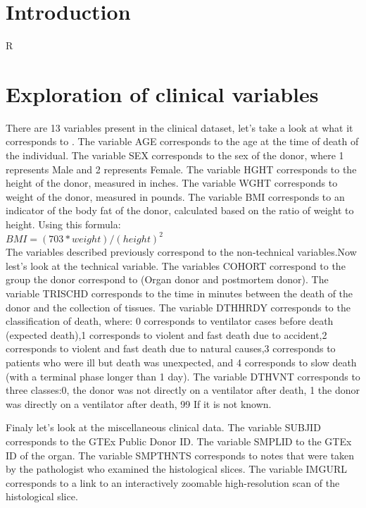 \documentclass[a4paper, 11pt]{article}
\begin{document}
\begin{multicols}{2}

\section{Introduction}
R \citep{R:2024}

\section{Exploration of  clinical variables}

There are 13 variables present in the clinical dataset, let's take a look at what it corresponds to . 
The variable AGE corresponds to the age at the time of death of the individual.
The variable SEX corresponds to the sex of the donor, where 1 represents Male and 2 represents Female.
The variable HGHT corresponds to the height of the donor, measured in inches.
The variable WGHT corresponds to weight of the donor, measured in pounds. 
The variable BMI corresponds to an indicator of the body fat of the donor, calculated based on the ratio of weight to height. Using this formula: 
\\

$ BMI = (703*weight)/(height)^2$ 
\\

The variables described previously correspond to the non-technical variables.Now lest's look at the technical variable. 
The variables COHORT correspond to the group the donor correspond to (Organ donor and postmortem donor). 
The variable TRISCHD corresponds to the time in minutes between the death of the donor and the collection of tissues.
The variable DTHHRDY corresponds to the classification of death, where: 0 corresponds to ventilator cases before death (expected death),1 corresponds to violent and fast death due to accident,2 corresponds to violent and fast death due to natural causes,3 corresponds to patients who were ill but death was unexpected, and 4 corresponds to slow death (with a terminal phase longer than 1 day). 
The variable DTHVNT corresponds to three classes:0, the donor was not directly on a ventilator after death, 1 the donor was directly on a ventilator after death, 99 If it is not known.

Finaly let's look at the miscellaneous clinical data. 
The variable SUBJID corresponds to the GTEx Public Donor ID. 
The variable SMPLID to  the GTEx ID of the organ. 
The variable SMPTHNTS corresponds to notes that were taken by the pathologist who examined the histological slices. 
The variable IMGURL corresponds to a link to an interactively zoomable high-resolution scan of the histological slice. 

\end{multicols}
\end{document}

